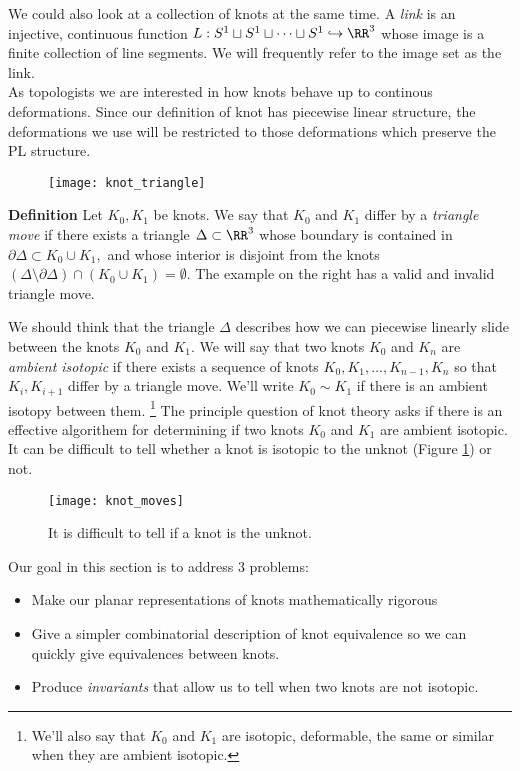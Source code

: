 We could also look at a collection of knots at the same time.  A \emph{link} is an injective, continuous function $L:S^1\sqcup S^1\sqcup \cdots \sqcup S^1 \hookrightarrow \RR^3 $ whose image is a finite collection of line segments. We will frequently refer to the image set as the link. \\
As topologists we are interested in how knots behave up to continous deformations. Since our definition of knot has piecewise linear structure, the deformations we use will be restricted to those deformations which preserve the PL structure. \\


\noindent\begin{minipage}{\textwidth}

\setlength\intextsep{0pt}
\begin{wrapfigure}{r}{4cm}
\centering
\texttt{[image: knot\_triangle]}

\end{wrapfigure}
\textbf{Definition \thetheorem}
Let $K_0, K_1$ be knots. We say that $K_0$ and $K_1$ differ by a \emph{triangle move} if there exists a triangle $\Delta\subset \RR^3$ whose boundary is contained in $\partial \Delta\subset K_0 \cup K_1,$
and whose interior is disjoint from the knots
$(\Delta\setminus \partial \Delta)\cap (K_0\cup K_1)=\emptyset.$
The example on the right has a valid and invalid triangle move.
\end{minipage}

We should think that the triangle $\Delta$ describes how we can piecewise linearly slide between the knots $K_0$ and $K_1$. We will say that two knots $K_0$ and $K_n$ are  \emph{ambient isotopic} if there exists a sequence of knots $K_0, K_1, \ldots,  K_{n-1}, K_n$ so that $K_i, K_{i+1}$ differ by a triangle move. We'll write $K_0\sim K_1$ if there is an ambient isotopy between them. \footnote{We'll also say that $K_0$ and $K_1$ are isotopic, deformable, the same or similar when they are ambient isotopic.} The principle question of knot theory asks if there is an effective algorithem for determining if two knots $K_0$ and $K_1$ are ambient isotopic. It can be difficult to tell whether a knot is isotopic to the unknot (Figure \ref{fig:knot_moves}) or not.
\begin{figure}
\centering
\texttt{[image: knot\_moves]}
\caption{It is difficult to tell if a knot is the unknot.}
\label{fig:knot_moves}
\end{figure}
Our goal in this section is to address 3 problems:
\begin{itemize}
\item Make our planar representations of knots mathematically rigorous
\item Give a simpler combinatorial description of knot equivalence so we can quickly give equivalences between knots. 
\item Produce \emph{invariants} that allow us to tell when two knots are not isotopic. 
\end{itemize}
